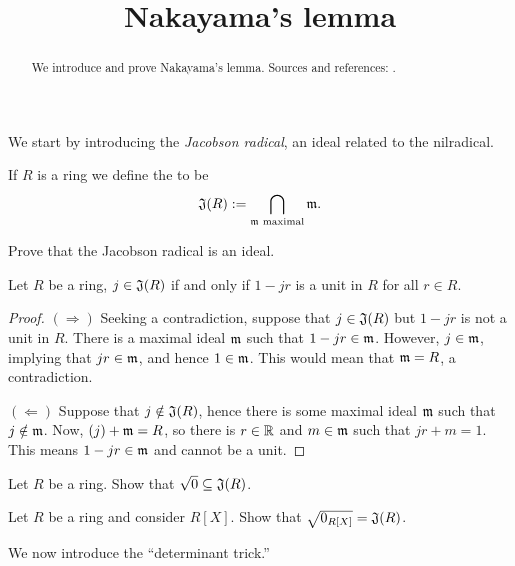 \documentclass{ximera}
\title{Nakayama's lemma}
\begin{document}
\begin{abstract}
  We introduce and prove Nakayama's lemma. Sources and references:
  \cite{AM1969,jpS2000}.
\end{abstract}
\maketitle

We start by introducing the \textit{Jacobson radical}, an ideal related to the nilradical.

\begin{definition}
  If $R$ is a ring we define the  to be
  \[
  \mathfrak J(R) := \bigcap_{\mathfrak{m} \text{ maximal}}\mathfrak{m}.
  \]
\end{definition}

\begin{exercise}
  Prove that the Jacobson radical is an ideal.
\end{exercise}

\begin{proposition}\label{P:CharJR}
  Let $R$ be a ring, $j\in\mathfrak J(R)$ if and only if $1-jr$ is a unit in
  $R$ for all $r\in R$.
  \begin{proof}
    $(\Rightarrow)$ Seeking a contradiction, suppose that $j\in \mathfrak
    J(R)$ but $1-jr$ is not a unit in $R$. There is a maximal ideal
    $\mathfrak{m}$ such that $1-jr\in\mathfrak{m}$. However, $j\in\mathfrak{m}$, implying that
    $jr\in\mathfrak{m}$, and hence $1\in\mathfrak{m}$. This would mean that $\mathfrak{m} = R$, a
    contradiction.

    $(\Leftarrow)$ Suppose that $j\notin\mathfrak J(R)$, hence there is some
    maximal ideal $\mathfrak{m}$ such that $j\notin\mathfrak{m}$. Now, $(j)+\mathfrak{m} = R$, so
    there is $r\in\mathbb R$ and $m\in\mathfrak{m}$ such that $jr+m = 1$. This means
    $1-jr\in\mathfrak{m}$ and cannot be a unit.
  \end{proof}
\end{proposition}

\begin{exercise}
  Let $R$ be a ring. Show that $\sqrt{0}\subseteq \mathfrak J(R)$.
\end{exercise}

\begin{exercise}
  Let $R$ be a ring and consider $R[X]$. Show that $\sqrt{0_{R[X]}} =
  \mathfrak J(R)$.
\end{exercise}





We now introduce the ``determinant trick.''
\end{document}
